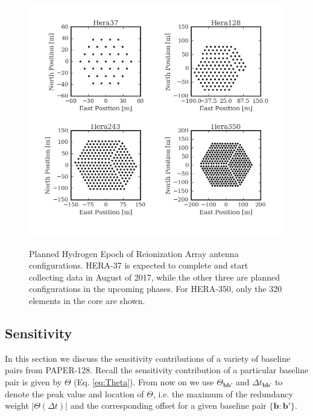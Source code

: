 \documentclass[twocolumn,apj,numberedappendix]{emulateapj}
\renewcommand\[{\begin{equation}}
\renewcommand\]{\end{equation}}
\begin{document}
\begin{figure}[h]
\includegraphics[width=\linewidth]{HeraAntpos}
\label{fig:HeraAntpos}
\caption{Planned Hydrogen Epoch of Reionization Array antenna configurations. HERA-37 is expected to complete and start collecting data in August of 2017, while the other three are planned configurations in the upcoming phases. For HERA-350, only the 320 elements in the core are shown. }
\end{figure}

\subsection{ Sensitivity \label{sec:sensitivity}}
In this section we discuss the sensitivity contributions of a variety of baseline pairs from PAPER-128.
Recall the sensitivity contribution of a particular baseline pair is given by $\Theta$ (Eq. \eqref{eq:Theta}). From now on we use $\Theta_{\boldsymbol{bb'}}$ and $\Delta t_{\boldsymbol{bb'}}$ to denote the peak value and location of $\Theta$, i.e. the maximum of the redundancy weight $|\Theta(\Delta t)|$ and the corresponding offset for a given baseline pair $\{\boldsymbol{b}:\boldsymbol{b'}\}$. 
\end{document}
